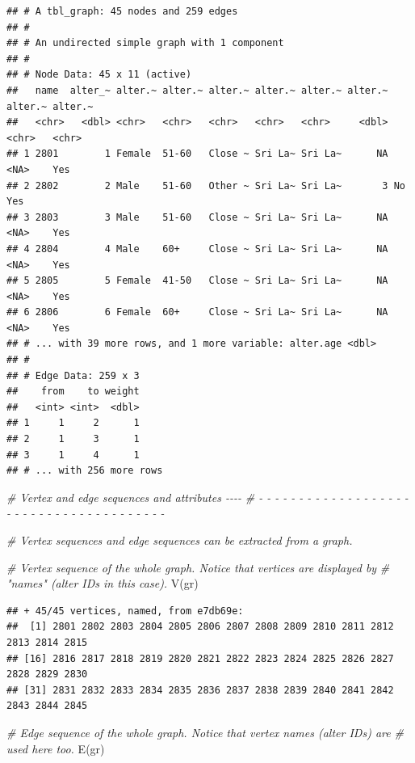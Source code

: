 \documentclass[
]{book}
\newenvironment{Shaded}{\begin{snugshade}}{\end{snugshade}}
\newcommand{\CommentTok}[1]{\textcolor[rgb]{0.56,0.35,0.01}{\textit{#1}}}
\newcommand{\FunctionTok}[1]{\textcolor[rgb]{0.00,0.00,0.00}{#1}}
\newcommand{\NormalTok}[1]{#1}
\begin{document}
\begin{verbatim}
## # A tbl_graph: 45 nodes and 259 edges
## #
## # An undirected simple graph with 1 component
## #
## # Node Data: 45 x 11 (active)
##   name  alter_~ alter.~ alter.~ alter.~ alter.~ alter.~ alter.~ alter.~ alter.~
##   <chr>   <dbl> <chr>   <chr>   <chr>   <chr>   <chr>     <dbl> <chr>   <chr>  
## 1 2801        1 Female  51-60   Close ~ Sri La~ Sri La~      NA <NA>    Yes    
## 2 2802        2 Male    51-60   Other ~ Sri La~ Sri La~       3 No      Yes    
## 3 2803        3 Male    51-60   Close ~ Sri La~ Sri La~      NA <NA>    Yes    
## 4 2804        4 Male    60+     Close ~ Sri La~ Sri La~      NA <NA>    Yes    
## 5 2805        5 Female  41-50   Close ~ Sri La~ Sri La~      NA <NA>    Yes    
## 6 2806        6 Female  60+     Close ~ Sri La~ Sri La~      NA <NA>    Yes    
## # ... with 39 more rows, and 1 more variable: alter.age <dbl>
## #
## # Edge Data: 259 x 3
##    from    to weight
##   <int> <int>  <dbl>
## 1     1     2      1
## 2     1     3      1
## 3     1     4      1
## # ... with 256 more rows
\end{verbatim}

\begin{Shaded}
\begin{Highlighting}[]
\CommentTok{\# Vertex and edge sequences and attributes                                  {-}{-}{-}{-}}
\CommentTok{\# {-} {-} {-} {-} {-} {-} {-} {-} {-} {-} {-} {-} {-} {-} {-} {-} {-} {-} {-} {-} {-} {-} {-} {-} {-} {-} {-} {-} {-} {-} {-} {-} {-} {-} {-} {-} {-} {-} {-} }

\CommentTok{\# Vertex sequences and edge sequences can be extracted from a graph.}

\CommentTok{\# Vertex sequence of the whole graph. Notice that vertices are displayed by}
\CommentTok{\# "names" (alter IDs in this case).}
\FunctionTok{V}\NormalTok{(gr)}
\end{Highlighting}
\end{Shaded}

\begin{verbatim}
## + 45/45 vertices, named, from e7db69e:
##  [1] 2801 2802 2803 2804 2805 2806 2807 2808 2809 2810 2811 2812 2813 2814 2815
## [16] 2816 2817 2818 2819 2820 2821 2822 2823 2824 2825 2826 2827 2828 2829 2830
## [31] 2831 2832 2833 2834 2835 2836 2837 2838 2839 2840 2841 2842 2843 2844 2845
\end{verbatim}

\begin{Shaded}
\begin{Highlighting}[]
\CommentTok{\# Edge sequence of the whole graph. Notice that vertex names (alter IDs) are}
\CommentTok{\# used here too.}
\FunctionTok{E}\NormalTok{(gr)}
\end{Highlighting}
\end{Shaded}
\end{document}
